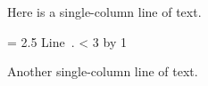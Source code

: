 \ifx\undefined\eplain  \fi

Here is a single-column line of text.
 
\doublecolumns
\newcount \xxx
{}
\par
\baselineskip = 2.5\baselineskip
\loop
	\hbox{Line \the\xxx.}
	\ifnum \xxx < 3
	\advance \xxx by 1
\repeat
 
\singlecolumn
Another single-column line of text.

\bye
